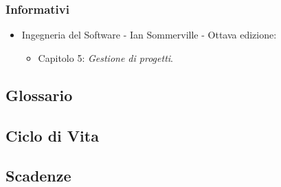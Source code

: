 \subsubsection{Informativi}
	\begin{itemize}
		\item Ingegneria del Software - Ian Sommerville - Ottava edizione:
		\begin{itemize}
			\item Capitolo 5: \textit{Gestione di progetti}.
		\end{itemize}
	\end{itemize}
\subsection{Glossario}
\subsection{Ciclo di Vita}
\subsection{Scadenze}
